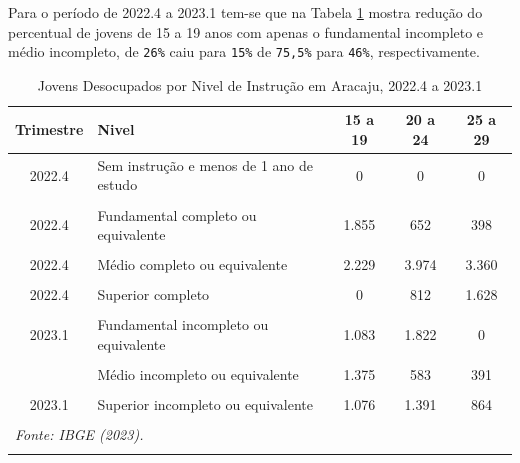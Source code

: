 \documentclass[
  12pt,
  a4paper,
]{article}
\begin{document}
Para o período de 2022.4 a 2023.1 tem-se que na Tabela \ref{tab9} mostra
redução do percentual de jovens de 15 a 19 anos com apenas o fundamental
incompleto e médio incompleto, de \texttt{26\%} caiu para \texttt{15\%}
de \texttt{75,5\%} para \texttt{46\%}, respectivamente.

\begingroup\fontsize{9}{11}\selectfont

\begin{longtable}[t]{c>{\raggedright\arraybackslash}p{9.2cm}ccc}
\caption{\label{tab:tab9}\label{tab9}Jovens Desocupados por Nivel de Instrução em Aracaju, 2022.4 a 2023.1}\\
\toprule
Trimestre & Nivel & 15 a 19 & 20 a 24 & 25 a 29\\
\midrule
2022.4 & Sem instrução e menos de 1 ano de estudo & 0 & 0 & 0\\
\cellcolor[HTML]{DCDCDC}{2022.4} & \cellcolor[HTML]{DCDCDC}{Fundamental incompleto ou equivalente} & \cellcolor[HTML]{DCDCDC}{2.389} & \cellcolor[HTML]{DCDCDC}{1.159} & \cellcolor[HTML]{DCDCDC}{363}\\
2022.4 & Fundamental completo ou equivalente & 1.855 & 652 & 398\\
\cellcolor[HTML]{DCDCDC}{2022.4} & \cellcolor[HTML]{DCDCDC}{Médio incompleto ou equivalente} & \cellcolor[HTML]{DCDCDC}{2.610} & \cellcolor[HTML]{DCDCDC}{798} & \cellcolor[HTML]{DCDCDC}{868}\\
2022.4 & Médio completo ou equivalente & 2.229 & 3.974 & 3.360\\
\addlinespace
\cellcolor[HTML]{DCDCDC}{2022.4} & \cellcolor[HTML]{DCDCDC}{Superior incompleto ou equivalente} & \cellcolor[HTML]{DCDCDC}{0} & \cellcolor[HTML]{DCDCDC}{3.225} & \cellcolor[HTML]{DCDCDC}{2.369}\\
2022.4 & Superior completo & 0 & 812 & 1.628\\
\cellcolor[HTML]{DCDCDC}{2023.1} & \cellcolor[HTML]{DCDCDC}{Sem instrução e menos de 1 ano de estudo} & \cellcolor[HTML]{DCDCDC}{0} & \cellcolor[HTML]{DCDCDC}{873} & \cellcolor[HTML]{DCDCDC}{0}\\
2023.1 & Fundamental incompleto ou equivalente & 1.083 & 1.822 & 0\\
\cellcolor[HTML]{DCDCDC}{2023.1} & \cellcolor[HTML]{DCDCDC}{Fundamental completo ou equivalente} & \cellcolor[HTML]{DCDCDC}{885} & \cellcolor[HTML]{DCDCDC}{0} & \cellcolor[HTML]{DCDCDC}{0}\\
\addlinespace
2023.1 & Médio incompleto ou equivalente & 1.375 & 583 & 391\\
\cellcolor[HTML]{DCDCDC}{2023.1} & \cellcolor[HTML]{DCDCDC}{Médio completo ou equivalente} & \cellcolor[HTML]{DCDCDC}{2.855} & \cellcolor[HTML]{DCDCDC}{3.359} & \cellcolor[HTML]{DCDCDC}{2.817}\\
2023.1 & Superior incompleto ou equivalente & 1.076 & 1.391 & 864\\
\cellcolor[HTML]{DCDCDC}{2023.1} & \cellcolor[HTML]{DCDCDC}{Superior completo} & \cellcolor[HTML]{DCDCDC}{0} & \cellcolor[HTML]{DCDCDC}{149} & \cellcolor[HTML]{DCDCDC}{926}\\
\bottomrule
\multicolumn{5}{l}{\rule{0pt}{1em}\textit{Fonte: IBGE (2023).}}\\
\multicolumn{5}{l}{\rule{0pt}{1em}}\\
\end{longtable}
\end{document}
